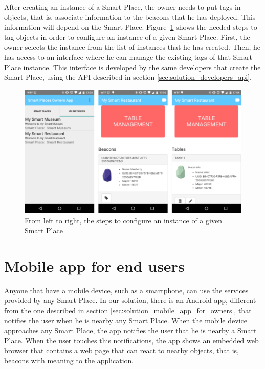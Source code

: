 After creating an instance of a Smart Place, the owner needs to put tags in objects, that is, associate information to the beacons that he has deployed.
This information will depend on the Smart Place.
Figure~\ref{fig:screenshot_ownersapp_configure} shows the needed steps to tag objects in order to configure an instance of a given Smart Place.
First, the owner selects the instance from the list of instances that he has created.
Then, he has access to an interface where he can manage the existing tags of that Smart Place instance.
This interface is developed by the same developers that create the Smart Place, using the \gls{API} described in section \ref{sec:solution_developers_api}.

\begin{figure}[!ht]
  \centering
    \includegraphics[width=1\textwidth, keepaspectratio]{images/screenshots/ownersapp_configure}
    \caption[Configure a Smart Place Instance]{From left to right, the steps to configure an instance of a given Smart Place}
    \label{fig:screenshot_ownersapp_configure}
\end{figure}

\section{Mobile app for end users}
\label{sec:solution_mobile_app_for_end_users}
Anyone that have a mobile device, such as a smartphone, can use the services provided by any Smart Place.
In our solution, there is an Android app, different from the one described in section \ref{sec:solution_mobile_app_for_owners}, that notifies the user when he is nearby any Smart Place.
When the mobile device approaches any Smart Place, the app notifies the user that he is nearby a Smart Place.
When the user touches this notifications, the app shows an embedded web browser that contains a web page that can react to nearby objects, that is, beacons with meaning to the application.

